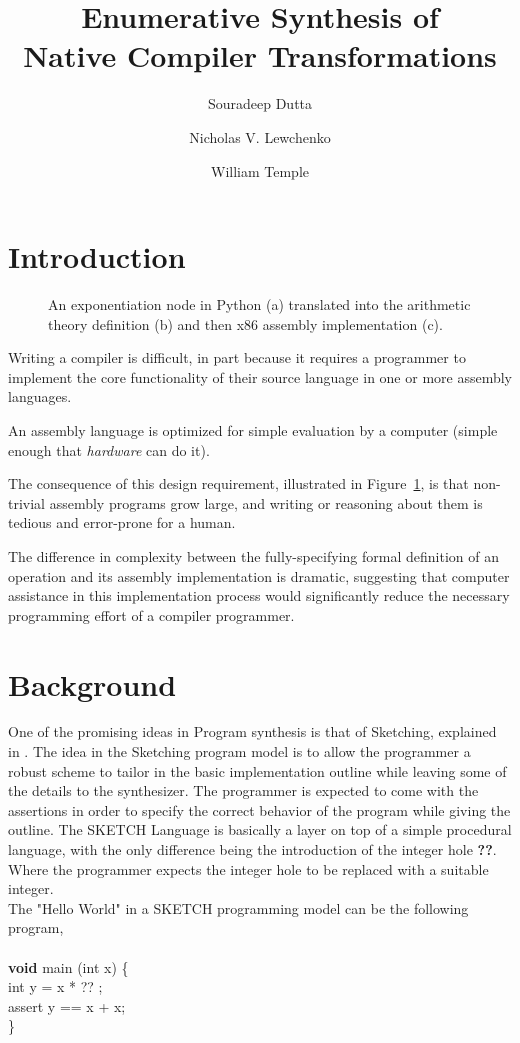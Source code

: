 \documentclass{article}
\title{Enumerative Synthesis of \\ Native Compiler Transformations}
\author{
  Souradeep Dutta \and
  Nicholas V. Lewchenko \and
  William Temple
}
\begin{document}
\maketitle

\section{Introduction}
\label{sec:introduction}

\begin{figure}
  \centering
  
  \caption{An exponentiation node in Python (a) translated into the
    arithmetic theory definition (b) and then x86 assembly
    implementation (c).}
  \label{fig:exp}
\end{figure}

Writing a compiler is difficult, in part because it requires a programmer to
implement the core functionality of their source language in one or more
assembly languages.

An assembly language is optimized for simple evaluation by a computer (simple
enough that \emph{hardware} can do it).

The consequence of this design requirement, illustrated in
Figure~\ref{fig:exp}, is that non-trivial assembly programs grow large, and
writing or reasoning about them is tedious and error-prone for a human.

The difference in complexity between the fully-specifying formal definition of
an operation and its assembly implementation is dramatic, suggesting that
computer assistance in this implementation process would significantly reduce
the necessary programming effort of a compiler programmer.

\section{Background}
\label{sec:background}

One of the promising ideas in Program synthesis is that of Sketching, explained
in \cite{phdthesis}. The idea in the Sketching program model is to allow the
programmer a robust scheme to tailor in the basic implementation outline while
leaving some of the details to the synthesizer. The programmer is expected to
come with the assertions in order to specify the correct behavior of the
program while giving the outline. The SKETCH Language is basically a layer on
top of a simple procedural language, with the only difference being the
introduction of the integer hole \textbf{??}.  Where the programmer expects the
integer hole to be replaced with a suitable integer.  \\ The "Hello World" in a
SKETCH programming model can be the following program, \\ \\ \textbf{void} main
(int x) \{ \\ int y = x * ?? ; \\ assert y == x + x; \\ \}
\end{document}
